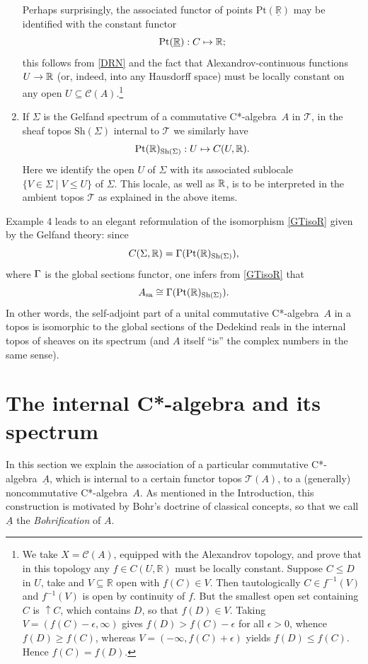 \documentclass[11pt]{article}
\newcommand{\beq}{\begin{equation}}
\newcommand{\eeq}{\end{equation}}
\newcommand{\ca}{C*-algebra} \newcommand{\jba}{JB-algebra}
\newcommand{\raw}{\rightarrow} \newcommand{\rat}{\mapsto}
\newcommand{\inv}{^{-1}}
\newcommand{\er}{\eqref}
\newcommand{\ep}{\epsilon} \newcommand{\varep}{\varepsilon}
\newcommand{\Sg}{\Sigma} \newcommand{\ta}{\tau} \newcommand{\ph}{\phi}
\newcommand{\CA}{{\mathcal A}} \newcommand{\CB}{{\mathcal B}}
\newcommand{\CT}{{\mathcal T}} \newcommand{\CV}{{\mathcal V}}
\newcommand{\alg}[1]{\ensuremath{#1}}
\newcommand{\Sh}{\ensuremath{\mathrm{Sh}}}
\newcommand{\context}{\ensuremath{\mathcal{C}}}
\newcommand{\asstopos}{\ensuremath{\mathcal{T}}}
\newcommand{\sa}{\ensuremath{_{\mathrm{sa}}}}
\newcommand{\field}[1]{\ensuremath{\mathbb{#1}}}
\newcommand{\uA}{\underline{A}}
\renewcommand{\CA}{\mathcal{C}(A)}
\newcommand{\TA}{\mathcal{T}(A)}
\newcommand{\ulR}{\underline{\mathbb{R}}}
\renewcommand{\TA}{\asstopos(\alg{A})}
\renewcommand{\CA}{\context(\alg{A})}
\begin{document}
\begin{enumerate}
Perhaps surprisingly, the associated functor of points 
 $\mathrm{Pt}(\ulR)$ may be
    identified with the constant functor 
 \beq    
     \mathrm{Pt}(\ulR): C\mapsto \R;  \label{cf} \eeq
this follows from \er{DRN} and the fact that Alexandrov-continuous functions $U\raw\R$
(or, indeed, into any Hausdorff space) must be locally constant on any open $U\subseteq \CA$.\footnote{We take $X=\CA$,
equipped with the Alexandrov topology, and prove that in this topology
any $f \in C(U,\field{R})$ must be locally constant. 
 Suppose $C \leqslant D$ in $U$, take and $V \subseteq
\field{R}$ open with $f(C)\in V$. Then 
 tautologically $C\in f\inv (V)$ and $f\inv(V)$ is open  by continuity of $f$.
 But the smallest open set containing $C$ is $\uparrow\! C$, which contains $D$, so that
 $f(D)\in V$. 
 Taking $V=(f(C)-\ep,\infty)$ gives $f(D)> f(C)-\ep$ for all $\ep>0$, whence
$f(D)\geqslant f(C)$, whereas  $V=(-\infty,f(C)+\ep)$ yields $f(D)\leqslant f(C)$.
Hence $f(C)=f(D)$.}
  \item If $\Sg$ is the Gelfand spectrum of a commutative \ca\ ${A}$
    in $\CT$,  in the sheaf topos $\Sh(\Sg)$ internal to $\CT$  we
    similarly have
    \begin{equation}
      \mathrm{Pt}(\R)_{\Sh(\Sg)}:U\mapsto C(U,\R).\label{ShSg}
    \end{equation}
    Here we identify the open $U$ of $\Sg$ with its associated
    sublocale $\{V\in\Sg\mid V\leqslant U\}$ of $\Sg$. This locale, as well
    as ${\mathbb R}$, is to be interpreted in the
    ambient topos $\CT$ as explained in the above items.
\end{enumerate}


Example 4 leads to an elegant reformulation of
the isomorphism \er{GTisoR} given by the Gelfand theory: since
\beq C(\Sg,\R)=\Gm(\mathrm{Pt}(\R)_{\Sh(\Sg)}),\label{preelegant}\eeq where
$\Gamma$ is the global sections functor, one infers from \er{GTisoR} that
 \beq
 A\sa\cong \Gm(\mathrm{Pt}(\R)_{\Sh(\Sg)}).\label{elegant}\eeq
 In other words, the self-adjoint part of a unital commutative \ca\ $A$ in a
topos is
 isomorphic to the global sections of the Dedekind reals in the internal topos
of sheaves on its spectrum (and $A$ itself
 ``is'' the complex numbers in the same sense).
\section{The internal C*-algebra and its spectrum}
\label{sec:internalalgebra}
In this section we explain the association  of a particular commutative \ca\
$\uA$, which is
internal to a certain functor topos $\TA$, to a (generally) noncommutative \ca\
$A$.
As mentioned in the Introduction, this  construction is motivated by Bohr's
doctrine of classical concepts, so that we call $\uA$ the {\it Bohrification} of
$A$.
\end{document}
